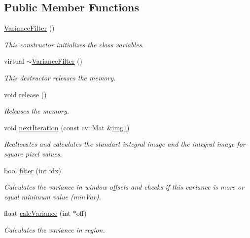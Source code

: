 \subsection*{Public Member Functions}
\begin{DoxyCompactItemize}
\item 
\hyperlink{classtld_1_1VarianceFilter_a0b8e9189907c3c5e9729b63d9beb8c04}{Variance\-Filter} ()
\begin{DoxyCompactList}\small\item\em This constructor initializes the class variables. \end{DoxyCompactList}\item 
virtual \hyperlink{classtld_1_1VarianceFilter_a8dfeb485fdad9b19ab1e37a91b7736f9}{$\sim$\-Variance\-Filter} ()
\begin{DoxyCompactList}\small\item\em This destructor releases the memory. \end{DoxyCompactList}\item 
void \hyperlink{classtld_1_1VarianceFilter_aa5ec15d4b3670db357b1c7372f5ba25a}{release} ()
\begin{DoxyCompactList}\small\item\em Releases the memory. \end{DoxyCompactList}\item 
void \hyperlink{classtld_1_1VarianceFilter_a29da4524e7ca1e02a4229fa004e20d75}{next\-Iteration} (const cv\-::\-Mat \&\hyperlink{namespacetld_ac832a3e8122e594c1c5321935cbc2639}{img1})
\begin{DoxyCompactList}\small\item\em Reallocates and calculates the standart integral image and the integral image for square pixel values. \end{DoxyCompactList}\item 
bool \hyperlink{classtld_1_1VarianceFilter_af1c369cc5338fae5cea4ad997fb1b642}{filter} (int idx)
\begin{DoxyCompactList}\small\item\em Calculates the variance in window offsets and checks if this variance is more or equal minimum value (min\-Var). \end{DoxyCompactList}\item 
float \hyperlink{classtld_1_1VarianceFilter_a3afefcc863a70e718a022731f7256d91}{calc\-Variance} (int $\ast$off)
\begin{DoxyCompactList}\small\item\em Calculates the variance in region. \end{DoxyCompactList}\end{DoxyCompactItemize}

